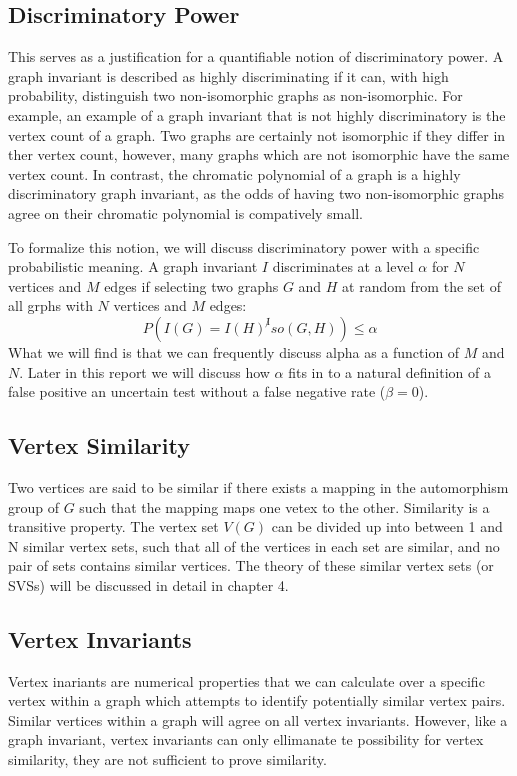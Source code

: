 \documentclass[11pt,a4paper]{report}
\begin{document}
\subsection{Discriminatory Power}
This serves as a justification for a quantifiable notion of discriminatory power.
A graph invariant is described as highly discriminating if it can, with high probability, distinguish two non-isomorphic graphs as non-isomorphic.
For example, an example of a graph invariant that is not highly discriminatory is the vertex count of a graph.
Two graphs are certainly not isomorphic if they differ in ther vertex count, however, many graphs which are not isomorphic have the same vertex count.
In contrast, the chromatic polynomial of a graph is a highly discriminatory graph invariant, as the odds of having two non-isomorphic graphs agree on their chromatic polynomial is compatively small.

To formalize this notion, we will discuss discriminatory power with a specific probabilistic meaning.
A graph invariant $I$ discriminates at a level $\alpha$ for $N$ vertices and $M$ edges if selecting two graphs $G$ and $H$ at random from the set of all grphs with $N$ vertices and $M$ edges:
$$P(I(G) = I(H) ^ \not Iso(G, H)) \leq \alpha$$
What we will find is that we can frequently discuss alpha as a function of $M$ and $N$.
Later in this report we will discuss how $\alpha$ fits in to a natural definition of a false positive an uncertain test without a false negative rate ($\beta = 0$).

\subsection{Vertex Similarity}
Two vertices are said to be similar if there exists a mapping in the automorphism group of $G$ such that the mapping maps one vetex to the other.
Similarity is a transitive property.
The vertex set $V(G)$ can be divided up into between 1 and N similar vertex sets, such that all of the vertices in each set are similar, and no pair of sets contains similar vertices.
The theory of these similar vertex sets (or SVSs) will be discussed in detail in chapter 4. 

\subsection{Vertex Invariants}
Vertex inariants are numerical properties that we can calculate over a specific vertex within a graph which attempts to identify potentially similar vertex pairs.
Similar vertices within a graph will agree on all vertex invariants.
However, like a graph invariant, vertex invariants can only ellimanate te possibility for vertex similarity, they are not sufficient to prove similarity.
\end{document}
